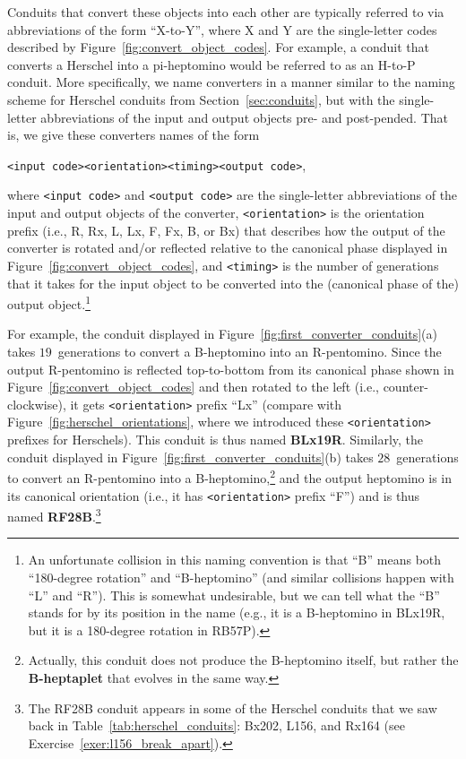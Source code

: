 Conduits that convert these objects into each other are typically referred to via abbreviations of the form ``X-to-Y'', where X and Y are the single-letter codes described by Figure~\ref{fig:convert_object_codes}. For example, a conduit that converts a Herschel into a pi-heptomino would be referred to as an H-to-P conduit. More specifically, we name converters in a manner similar to the naming scheme for Herschel conduits from Section~\ref{sec:conduits}, but with the single-letter abbreviations of the input and output objects pre- and post-pended. That is, we give these converters names of the form
\begin{center}
	\verb|<input code><orientation><timing><output code>|,
\end{center}
\noindent where \verb|<input code>| and \verb|<output code>| are the single-letter abbreviations of the input and output objects of the converter, \verb|<orientation>| is the orientation prefix (i.e., R, Rx, L, Lx, F, Fx, B, or Bx) that describes how the output of the converter is rotated and/or reflected relative to the canonical phase displayed in Figure~\ref{fig:convert_object_codes}, and \verb|<timing>| is the number of generations that it takes for the input object to be converted into the (canonical phase of the) output object.\footnote{An unfortunate collision in this naming convention is that ``B'' means both ``180-degree rotation'' and ``B-heptomino'' (and similar collisions happen with ``L'' and ``R''). This is somewhat undesirable, but we can tell what the ``B'' stands for by its position in the name (e.g., it is a B-heptomino in BLx19R, but it is a 180-degree rotation in RB57P).}

For example, the conduit displayed in Figure~\ref{fig:first_converter_conduits}(a) takes $19$~generations to convert a B-heptomino into an R-pentomino. Since the output R-pentomino is reflected top-to-bottom from its canonical phase shown in Figure~\ref{fig:convert_object_codes} and then rotated to the left (i.e., counter-clockwise), it gets \verb|<orientation>| prefix ``Lx'' (compare with Figure~\ref{fig:herschel_orientations}, where we introduced these \verb|<orientation>| prefixes for Herschels). This conduit is thus named \textbf{BLx19R}. Similarly, the conduit displayed in Figure~\ref{fig:first_converter_conduits}(b) takes $28$~generations to convert an R-pentomino into a B-heptomino,\footnote{Actually, this conduit does not produce the B-heptomino itself, but rather the \textbf{B-heptaplet} that evolves in the same way.} and the output heptomino is in its canonical orientation (i.e., it has \verb|<orientation>| prefix ``F'') and is thus named \textbf{RF28B}.\footnote{The RF28B conduit appears in some of the Herschel conduits that we saw back in Table~\ref{tab:herschel_conduits}: Bx202, L156, and Rx164 (see Exercise~\ref{exer:l156_break_apart}).}

